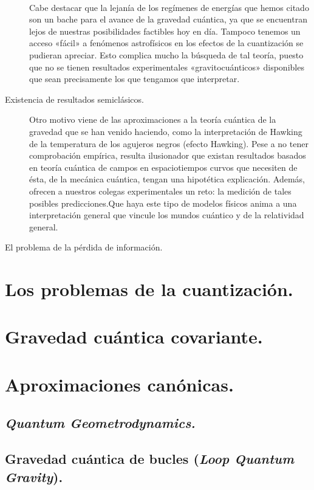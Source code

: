 \documentclass[11pt,a4paper,titlepage]{article}
\begin{document}
\begin{description}
{  \\\par Cabe destacar que la lejanía de los regímenes de energías que hemos citado son un bache para el avance de la gravedad cuántica, ya que se encuentran lejos de nuestras posibilidades factibles hoy en día. Tampoco tenemos un acceso «fácil» a fenómenos astrofísicos en los efectos de la cuantización se pudieran apreciar. Esto complica mucho la búsqueda de tal teoría, puesto que no se tienen resultados experimentales «gravitocuánticos» disponibles que sean precisamente los que tengamos que interpretar.}
  \item[Existencia de resultados semiclásicos.]{Otro motivo viene de las aproximaciones a la teoría cuántica de la gravedad que se han venido haciendo, como la interpretación de Hawking de la temperatura de los agujeros negros (efecto Hawking). Pese a no tener comprobación empírica, resulta ilusionador que existan resultados basados en teoría cuántica de campos en espaciotiempos curvos que necesiten de ésta, de la mecánica cuántica, tengan una hipotética explicación. Además, ofrecen a nuestros colegas experimentales un reto: la medición de tales posibles predicciones.Que haya este tipo de modelos físicos anima a una interpretación general que vincule los mundos cuántico y de la relatividad general.}
  \item[El problema de la pérdida de información.]{}
\end{description}

%
%
%
%
\newpage
\section{Los problemas de la cuantización.}

%
%
%
%
\newpage
\section{Gravedad cuántica covariante.} %

%
%
%
%
\newpage
\section{Aproximaciones canónicas.} %
\subsection{\textit{Quantum Geometrodynamics.}}

\subsection{Gravedad cuántica de bucles (\textit{Loop Quantum Gravity}).}
\end{document}

